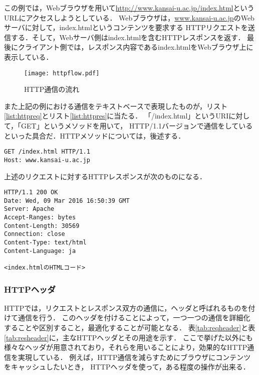 この例では，Webブラウザを用いて\url{http://www.kansai-u.ac.jp/index.html}というURLにアクセスしようとしている．
Webブラウザは，\url{www.kansai-u.ac.jp}のWebサーバに対して，index.htmlというコンテンツを要求する
HTTPリクエストを送信する．そして，Webサーバ側はindex.htmlを含むHTTPレスポンスを返す．
最後にクライアント側では，レスポンス内容であるindex.htmlをWebブラウザ上に表示している．

\begin{figure}[htbp]
    \centering
    \texttt{[image: httpflow.pdf]}
    \caption{HTTP通信の流れ}
    \label{fig:httpflow}
\end{figure}

また上記の例における通信をテキストベースで表現したものが，リスト\ref{list:httpreq}とリスト\ref{list:httpres}に当たる．
「/index.html」というURIに対して，「GET」というメソッドを用いて，
HTTP/1.1バージョンで通信をしているといった具合だ．HTTPメソッドについては，後述する．

\begin{lstlisting}[basicstyle=\ttfamily\small, numbers=none, frame=tlrb, caption=HTTPリクエスト, label=list:httpreq]
GET /index.html HTTP/1.1
Host: www.kansai-u.ac.jp
\end{lstlisting}

上述のリクエストに対するHTTPレスポンスが次のものになる．
\begin{lstlisting}[basicstyle=\ttfamily\small, numbers=none, frame=tlrb, caption=HTTPレスポンス, label=list:httpres]
HTTP/1.1 200 OK
Date: Wed, 09 Mar 2016 16:50:39 GMT
Server: Apache
Accept-Ranges: bytes
Content-Length: 30569
Connection: close
Content-Type: text/html
Content-Language: ja

<index.htmlのHTMLコード>
\end{lstlisting}

\subsubsection{HTTPヘッダ}
HTTPでは，リクエストとレスポンス双方の通信に，ヘッダと呼ばれるものを付けて通信を行う．
このヘッダを付けることによって，一つ一つの通信を詳細化することや区別すること，最適化することが可能となる．
表\ref{tab:reqheader}と表\ref{tab:resheader}に，主なHTTPヘッダとその用途を示す．
ここで挙げた以外にも様々なヘッダが用意されており，それらを用いることにより，効果的なHTTP通信を実現している．
例えば，HTTP通信を減らすためにブラウザにコンテンツをキャッシュしたいとき，
HTTPヘッダを使って，ある程度の操作が出来る．

